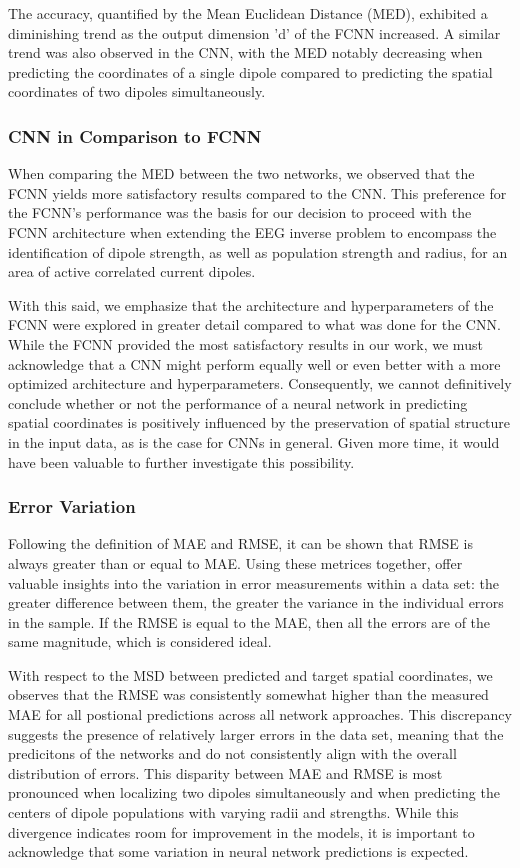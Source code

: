 \documentclass[a4paper, UKenglish, 11pt]{uiomaster}
\begin{document}
The accuracy, quantified by the Mean Euclidean Distance (MED), exhibited a diminishing trend as the output dimension 'd' of the FCNN increased. A similar trend was also observed in the CNN, with the MED notably decreasing when predicting the coordinates of a single dipole compared to predicting the spatial coordinates of two dipoles simultaneously.


\subsubsection{CNN in Comparison to FCNN}
When comparing the MED between the two networks, we observed that the FCNN yields more satisfactory results compared to the CNN. This preference for the FCNN's performance was the basis for our decision to proceed with the FCNN architecture when extending the EEG inverse problem to encompass the identification of dipole strength, as well as population strength and radius, for an area of active correlated current dipoles.

With this said, we emphasize that the architecture and hyperparameters of the FCNN were explored in greater detail compared to what was done for the CNN. While the FCNN provided the most satisfactory results in our work, we must acknowledge that a CNN might perform equally well or even better with a more optimized architecture and hyperparameters. Consequently, we cannot definitively conclude whether or not the performance of a neural network in predicting spatial coordinates is positively influenced by the preservation of spatial structure in the input data, as is the case for CNNs in general. Given more time, it would have been valuable to further investigate this possibility.

\subsubsection{Error Variation}
Following the definition of MAE and RMSE, it can be shown that RMSE is always greater than or equal to MAE. Using these metrices together, offer valuable insights into the variation in error measurements within a data set: the greater difference between them, the greater the variance in the individual errors in the sample. If the RMSE is equal to the MAE, then all the errors are of the same magnitude, which is considered ideal.

With respect to the MSD between predicted and target spatial coordinates, we observes that the RMSE was consistently somewhat higher than the measured MAE for all postional predictions across all network approaches. This discrepancy suggests the presence of relatively larger errors in the data set, meaning that the predicitons of the networks and do not consistently align with the overall distribution of errors. This disparity between MAE and RMSE is most pronounced when localizing two dipoles simultaneously and when predicting the centers of dipole populations with varying radii and strengths. While this divergence indicates room for improvement in the models, it is important to acknowledge that some variation in neural network predictions is expected.
\end{document}
